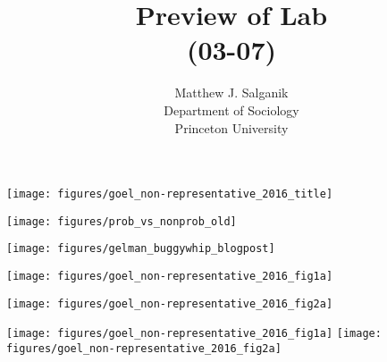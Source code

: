 \documentclass[aspectratio=169]{beamer}
\title[]{Preview of Lab\\(03-07)}
\author[]{Matthew J. Salganik\\Department of Sociology\\Princeton University}
\date[]{Soc 596: Computational Social Science\\Fall 2016
\vfill
\begin{flushright}
\vspace{0.6in}
\texttt{[image: figures/cc.png]}
\end{flushright}
}
\def\vf{\vfill}
\begin{document}
\frame{\titlepage}
\begin{frame}

\begin{center}
\texttt{[image: figures/goel\_non-representative\_2016\_title]}
\end{center}

\end{frame}
\begin{frame}

\begin{center}
\texttt{[image: figures/prob\_vs\_nonprob\_old]}
\end{center}

\vf
{}

\end{frame}
\begin{frame}

\begin{center}
\texttt{[image: figures/gelman\_buggywhip\_blogpost]}
\end{center}

\vf
{}

\end{frame}
\begin{frame}

\begin{center}
\texttt{[image: figures/goel\_non-representative\_2016\_fig1a]}
\end{center}

\end{frame}
\begin{frame}

\begin{center}
\texttt{[image: figures/goel\_non-representative\_2016\_fig2a]}
\end{center}

\end{frame}
\begin{frame}

\begin{center}
\texttt{[image: figures/goel\_non-representative\_2016\_fig1a]}
\texttt{[image: figures/goel\_non-representative\_2016\_fig2a]}
\end{center}

\end{frame}
\end{document}
